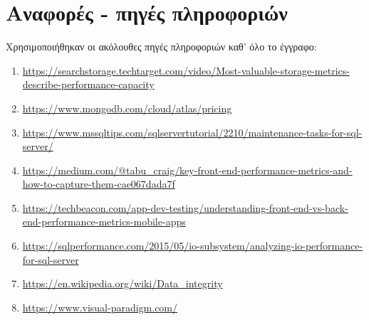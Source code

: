 \section{Αναφορές - πηγές πληροφοριών}
Χρησιμοποιήθηκαν οι ακόλουθες πηγές πληροφοριών καθ' όλο το έγγραφο:

\begin{enumerate}
    \item \url{https://searchstorage.techtarget.com/video/Most-valuable-storage-metrics-describe-performance-capacity}
    \item \url{https://www.mongodb.com/cloud/atlas/pricing}
    \item \url{https://www.mssqltips.com/sqlservertutorial/2210/maintenance-tasks-for-sql-server/}
    \item \url{https://medium.com/@tabu_craig/key-front-end-performance-metrics-and-how-to-capture-them-cae067dada7f}
    \item \url{https://techbeacon.com/app-dev-testing/understanding-front-end-vs-back-end-performance-metrics-mobile-apps}
    \item \url{https://sqlperformance.com/2015/05/io-subsystem/analyzing-io-performance-for-sql-server}
    \item \url{ https://en.wikipedia.org/wiki/Data_integrity}
    \item \url{https://www.visual-paradigm.com/}
\end{enumerate}

